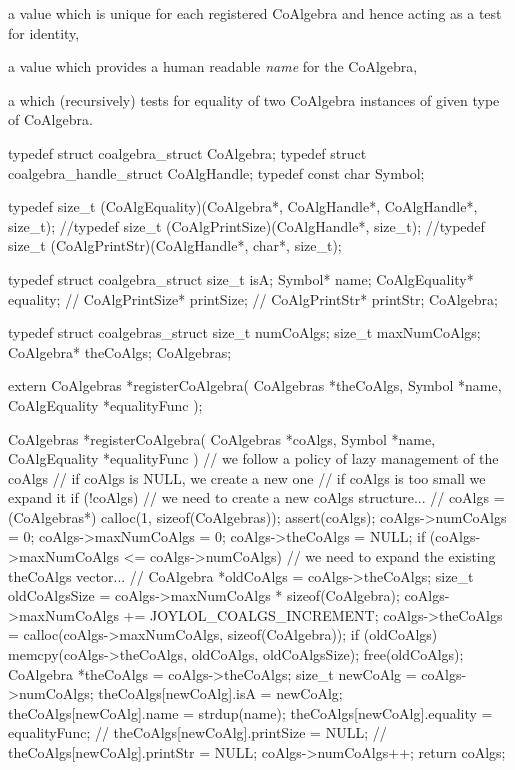 \startitemize

\item a  value which is unique for each registered CoAlgebra 
and hence acting as a test for identity, 

\item a  value which provides a human readable \emph{name} 
for the CoAlgebra, 

\item a  which (recursively) tests for equality of two 
CoAlgebra instances of given type of CoAlgebra.

\stopitemize

\startCHeader
typedef struct coalgebra_struct         CoAlgebra;
typedef struct coalgebra_handle_struct  CoAlgHandle;
typedef const char Symbol;

typedef size_t (CoAlgEquality)(CoAlgebra*, CoAlgHandle*, CoAlgHandle*, size_t);
//typedef size_t (CoAlgPrintSize)(CoAlgHandle*, size_t);
//typedef size_t (CoAlgPrintStr)(CoAlgHandle*, char*, size_t);

typedef struct coalgebra_struct {
  size_t          isA;
  Symbol*         name;
  CoAlgEquality*  equality;
//  CoAlgPrintSize* printSize;
//  CoAlgPrintStr*  printStr;
} CoAlgebra;

typedef struct coalgebras_struct {
  size_t numCoAlgs;
  size_t maxNumCoAlgs;
  CoAlgebra* theCoAlgs;
} CoAlgebras;
\stopCHeader

\startTestSuite[registerCoAlgebra]

\startCHeader
extern CoAlgebras *registerCoAlgebra(
  CoAlgebras *theCoAlgs,
  Symbol *name,
  CoAlgEquality *equalityFunc
);
\stopCHeader

\startCCode
CoAlgebras *registerCoAlgebra(
  CoAlgebras *coAlgs,
  Symbol *name,
  CoAlgEquality *equalityFunc
) {
  // we follow a policy of lazy management of the coAlgs
  // if coAlgs is NULL, we create a new one
  // if coAlgs is too small we expand it
  if (!coAlgs) {
    // we need to create a new coAlgs structure...
    //
    coAlgs = (CoAlgebras*) calloc(1, sizeof(CoAlgebras));
    assert(coAlgs);
    coAlgs->numCoAlgs    = 0;
    coAlgs->maxNumCoAlgs = 0;
    coAlgs->theCoAlgs    = NULL;
  }
  if (coAlgs->maxNumCoAlgs <= coAlgs->numCoAlgs) {
    // we need to expand the existing theCoAlgs vector...
    //
    CoAlgebra *oldCoAlgs = coAlgs->theCoAlgs;
    size_t oldCoAlgsSize = coAlgs->maxNumCoAlgs * sizeof(CoAlgebra);
    coAlgs->maxNumCoAlgs += JOYLOL_COALGS_INCREMENT;
    coAlgs->theCoAlgs = calloc(coAlgs->maxNumCoAlgs, sizeof(CoAlgebra));
    if (oldCoAlgs) {
      memcpy(coAlgs->theCoAlgs, oldCoAlgs, oldCoAlgsSize);
      free(oldCoAlgs);
    }
  }
  CoAlgebra *theCoAlgs = coAlgs->theCoAlgs;
  size_t newCoAlg = coAlgs->numCoAlgs;
  theCoAlgs[newCoAlg].isA       = newCoAlg;
  theCoAlgs[newCoAlg].name      = strdup(name);
  theCoAlgs[newCoAlg].equality  = equalityFunc;
  //  theCoAlgs[newCoAlg].printSize = NULL;
  //  theCoAlgs[newCoAlg].printStr  = NULL;
  coAlgs->numCoAlgs++;
  return coAlgs;
}
\stopCCode

